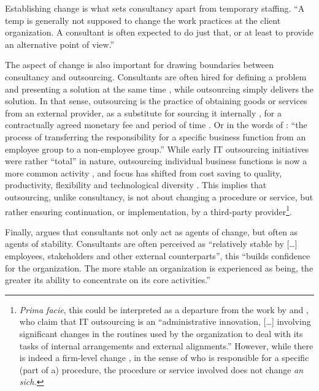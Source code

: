 \documentclass[12pt]{article}
\begin{document}
Establishing change is what sets consultancy apart from temporary
staffing. ``A temp is generally not supposed to change the work
practices at the client organization. A consultant is often expected to
do just that, or at least to provide an alternative point of view.''
\citep[ 5]{furusten2000}

The aspect of change is also important for drawing boundaries between
consultancy and outsourcing. Consultants are often hired for defining a
problem and presenting a solution at the same time \citep[
272]{furusten2009}, while outsourcing simply delivers the solution. In
that sense, outsourcing is the practice of obtaining goods or services
from an external provider, as a substitute for sourcing it internally
\citep[ 2]{lacity2012}, for a contractually agreed monetary fee and
period of time \citep[ 20-21]{leimeister2010}. Or in the words of
\citet[374]{zhu2001}: ``the process of transferring the responsibility
for a specific business function from an employee group to a
non-employee group.'' While early IT outsourcing initiatives were rather
``total'' \citet{willcocks1995} in nature, outsourcing individual
business functions is now a more common activity \citep[ 377]{zhu2001},
and focus has shifted from cost saving to quality, productivity,
flexibility and technological diversity \citep[ 185]{kirilov2012}. This
implies that outsourcing, unlike consultancy, is not about changing a
procedure or service, but rather ensuring continuation, or
implementation, by a third-party provider\footnote{\emph{Prima facie},
  this could be interpreted as a departure from the work by
  \citet{loh1992} and \citet{venkatraman1994}, who claim that IT
  outsourcing is an ``administrative innovation, {[}\ldots{]} involving
  significant changes in the routines used by the organization to deal
  with its tasks of internal arrangements and external alignments.''
  However, while there is indeed a firm-level change \citep[
  14]{nelson1985}, in the sense of who is responsible for a specific
  (part of a) procedure, the procedure or service involved does not
  change \emph{an sich.}}.

Finally, \citet[272-273]{furusten2009} argues that consultants not only
act as agents of change, but often as agents of stability. Consultants
are often perceived as ``relatively stable by {[}\ldots{]} employees,
stakeholders and other external counterparts'', this ``builds confidence
for the organization. The more stable an organization is experienced as
being, the greater its ability to concentrate on its core activities.''
\end{document}

